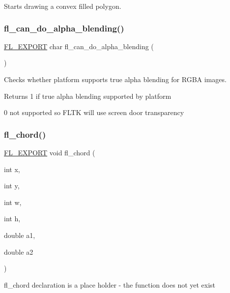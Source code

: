 Starts drawing a convex filled polygon. \mbox{\label{group__fl__drawings_gabc04f934741e868e3d537761a955bfdb}} 
\subsubsection{\texorpdfstring{fl\+\_\+can\+\_\+do\+\_\+alpha\+\_\+blending()}{fl\_can\_do\_alpha\_blending()}}
{\footnotesize\ttfamily \hyperlink{_fl___export_8_h_aa9ba29a18aee9d738370a06eeb4470fc}{F\+L\+\_\+\+E\+X\+P\+O\+RT} char fl\+\_\+can\+\_\+do\+\_\+alpha\+\_\+blending (\begin{DoxyParamCaption}{ }\end{DoxyParamCaption})}

Checks whether platform supports true alpha blending for R\+G\+BA images. \begin{DoxyReturn}{Returns}
1 if true alpha blending supported by platform 

0 not supported so F\+L\+TK will use screen door transparency 
\end{DoxyReturn}
\mbox{\label{group__fl__drawings_ga607deaaf470293e97c2548266ea73e43}} 
\subsubsection{\texorpdfstring{fl\+\_\+chord()}{fl\_chord()}}
{\footnotesize\ttfamily \hyperlink{_fl___export_8_h_aa9ba29a18aee9d738370a06eeb4470fc}{F\+L\+\_\+\+E\+X\+P\+O\+RT} void fl\+\_\+chord (\begin{DoxyParamCaption}\item[{int}]{x,  }\item[{int}]{y,  }\item[{int}]{w,  }\item[{int}]{h,  }\item[{double}]{a1,  }\item[{double}]{a2 }\end{DoxyParamCaption})}

fl\+\_\+chord declaration is a place holder -\/ the function does not yet exist \mbox{\label{group__fl__drawings_gac4540eaf7b5f23944cf332fc8f81f57e}} 
